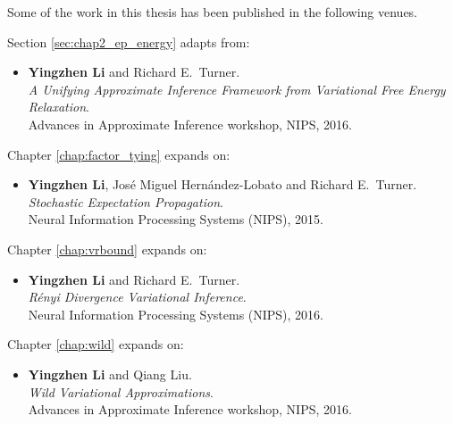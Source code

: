 
\begin{publication}
Some of the work in this thesis has been published in the following venues.

Section \ref{sec:chap2_ep_energy} adapts from:
\begin{itemize}
\item \textbf{Yingzhen Li} and Richard E.~Turner. \\
\emph{A Unifying Approximate Inference Framework from Variational Free Energy Relaxation}. \\
Advances in Approximate Inference workshop, NIPS, 2016.
\end{itemize}

Chapter \ref{chap:factor_tying} expands on:
\begin{itemize}
\item \textbf{Yingzhen Li}, Jos{\'e} Miguel Hern{\'a}ndez-Lobato and Richard E.~Turner. \\
\emph{Stochastic Expectation Propagation}. \\
Neural Information Processing Systems (NIPS), 2015.


\end{itemize}

Chapter \ref{chap:vrbound} expands on:

\begin{itemize}
\item \textbf{Yingzhen Li} and Richard E.~Turner. \\
\emph{R{\'e}nyi Divergence Variational Inference}. \\
Neural Information Processing Systems (NIPS), 2016.

\end{itemize}

Chapter \ref{chap:wild} expands on:

\begin{itemize}
\item \textbf{Yingzhen Li} and Qiang Liu. \\
\emph{Wild Variational Approximations}. \\
Advances in Approximate Inference workshop, NIPS, 2016.
\end{itemize}


\end{publication}
